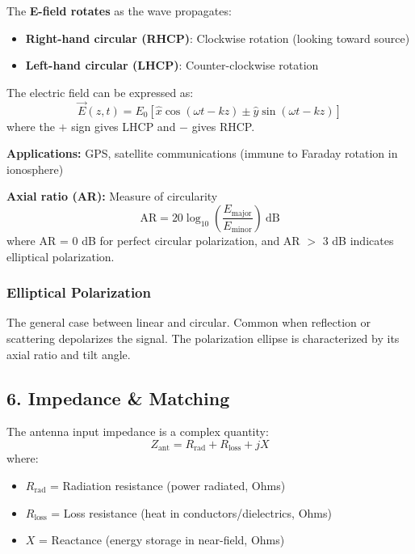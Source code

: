The \textbf{E-field rotates} as the wave propagates:
\begin{itemize}
\item \textbf{Right-hand circular (RHCP)}: Clockwise rotation (looking toward source)
\item \textbf{Left-hand circular (LHCP)}: Counter-clockwise rotation
\end{itemize}

The electric field can be expressed as:
\begin{equation}
\vec{E}(z,t) = E_0[\hat{x}\cos(\omega t - kz) \pm \hat{y}\sin(\omega t - kz)]
\label{eq:circular-polarization}
\end{equation}
where the $+$ sign gives LHCP and $-$ gives RHCP.

\textbf{Applications:} GPS, satellite communications (immune to Faraday rotation in ionosphere)

\textbf{Axial ratio (AR):} Measure of circularity
\begin{equation}
\text{AR} = 20\log_{10}\left(\frac{E_{\text{major}}}{E_{\text{minor}}}\right)\ \text{dB}
\label{eq:axial-ratio}
\end{equation}
where AR = 0 dB for perfect circular polarization, and AR $>$ 3 dB indicates elliptical polarization.

\subsubsection{Elliptical Polarization}

The general case between linear and circular. Common when reflection or scattering depolarizes the signal. The polarization ellipse is characterized by its axial ratio and tilt angle.

\subsection{6. Impedance \& Matching}

The antenna input impedance is a complex quantity:
\begin{equation}
Z_{\text{ant}} = R_{\text{rad}} + R_{\text{loss}} + jX
\label{eq:antenna-impedance}
\end{equation}
where:
\begin{itemize}
\item $R_{\text{rad}}$ = Radiation resistance (power radiated, Ohms)
\item $R_{\text{loss}}$ = Loss resistance (heat in conductors/dielectrics, Ohms)
\item $X$ = Reactance (energy storage in near-field, Ohms)
\end{itemize}

